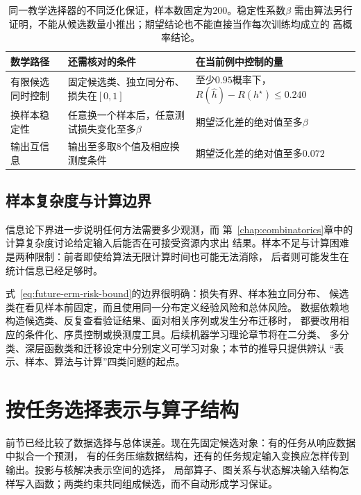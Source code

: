 \begin{table}[htbp]
  \centering
  \begin{tabularx}{\linewidth}{lXX}
    \toprule
    数学路径 & 还需核对的条件 & 在当前例中控制的量\\
    \midrule
    有限候选同时控制 & 固定候选类、独立同分布、损失在$[0,1]$ & 至少$0.95$概率下，
    $R(\widehat h)-R(h^\star)\leq0.240$\\
    换样本稳定性 & 任意换一个样本后，任意测试损失变化至多$\beta$ & 期望泛化差的绝对值至多$\beta$\\
    输出互信息 & 输出至多取$8$个值及相应换测度条件 & 期望泛化差的绝对值至多$0.072$\\
    \bottomrule
  \end{tabularx}
  \caption{同一教学选择器的不同泛化保证，样本数固定为$200$。稳定性系数$\beta$
  需由算法另行证明，不能从候选数量小推出；期望结论也不能直接当作每次训练均成立的
  高概率结论。}
  \label{tab:future-generalization-guarantees}
\end{table}

\subsection{样本复杂度与计算边界}
\label{sec:future-learning-computation-boundaries}

信息论下界进一步说明任何方法需要多少观测，而
第~\ref{chap:combinatorics}章中的计算复杂度讨论给定输入后能否在可接受资源内求出
结果。样本不足与计算困难是两种限制：前者即使给算法无限计算时间也可能无法消除，
后者则可能发生在统计信息已经足够时。

式~\eqref{eq:future-erm-risk-bound}的边界很明确：损失有界、样本独立同分布、
候选类在看见样本前固定，而且使用同一分布定义经验风险和总体风险。
数据依赖地构造候选类、反复查看验证结果、面对相关序列或发生分布迁移时，
都要改用相应的条件化、序贯控制或换测度工具。后续机器学习理论章节将在二分类、
多分类、深层函数类和迁移设定中分别定义可学习对象；本节的推导只提供辨认
“表示、样本、算法与计算”四类问题的起点。

\section{按任务选择表示与算子结构}
\label{sec:future-representation-structure}

前节已经比较了数据选择与总体误差。现在先固定候选对象：有的任务从响应数据中拟合一个预测，
有的任务压缩数据结构，还有的任务规定输入变换应怎样传到输出。投影与核解决表示空间的选择，
局部算子、图关系与状态解决输入结构怎样写入函数；两类约束共同组成候选，而不自动形成学习保证。

